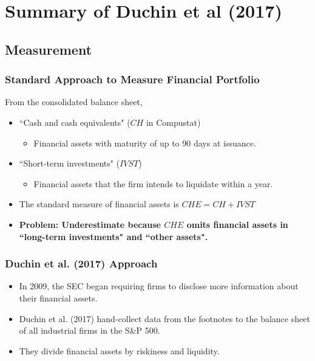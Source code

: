 \documentclass[handout]{beamer}
\begin{document}
\section{Summary of Duchin et al (2017)}

\subsection{Measurement}



\begin{frame}[label=standardapproach]
\frametitle{Standard Approach to Measure Financial Portfolio}
From the consolidated balance sheet,
\bigskip
\begin{itemize}[<+->]
\item ``Cash and cash equivalents" ($CH$ in Compustat)
\begin{itemize}
\item Financial assets with maturity of up to 90 days at issuance.
\end{itemize}
\bigskip
\item ``Short-term investments" ($IVST$)
\begin{itemize}
\item Financial assets that the firm intends to liquidate within a year.
\end{itemize}

\bigskip
\item The standard measure of financial assets is $CHE = CH + IVST$

\bigskip

\item \textbf{Problem: Underestimate because $CHE$ omits financial assets in ``long-term investments" and ``other assets".}
\end{itemize}
\bigskip


\hyperlink{APPL2007}{}

\end{frame}


\begin{frame}[label=duchinapproach]
\frametitle{Duchin et al. (2017) Approach}
\begin{itemize}[<+->]
\item In 2009, the SEC began requiring firms to disclose more information about their financial assets. \hyperlink{APPL2011}{}
\bigskip
\item Duchin et al. (2017) hand-collect data from the footnotes to the balance sheet of all industrial firms in the S\&P 500. 
\bigskip
\item They divide financial assets by riskiness and liquidity. \hyperlink{classify}{}
\end{itemize}

\end{frame}
\end{document}
